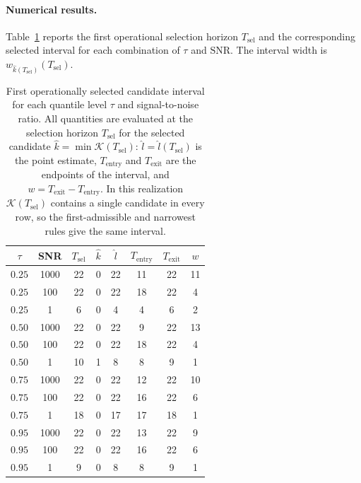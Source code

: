 \documentclass[12pt,a4paper]{article}
\begin{document}
\paragraph{Numerical results.}
Table~\ref{tab:simulation_est_interval} reports the first operational
selection horizon $T_{\mathrm{sel}}$ and the corresponding selected
interval for each combination of $\tau$ and $\mathrm{SNR}$. The
interval width is
$w_{\widehat k(T_{\mathrm{sel}})}(T_{\mathrm{sel}})$.

\begin{table}[htbp]
	\centering
	\caption{First operationally selected candidate interval for each quantile level
		$\tau$ and signal-to-noise ratio. All quantities are evaluated at the selection
		horizon $T_{\mathrm{sel}}$ for the selected candidate
		$\widehat k=\min\mathcal K(T_{\mathrm{sel}})$: $\widehat l=\widehat l(T_{\mathrm{sel}})$
		is the point estimate, $T_{\mathrm{entry}}$ and $T_{\mathrm{exit}}$ are the
		endpoints of the interval, and $w=T_{\mathrm{exit}}-T_{\mathrm{entry}}$. In
		this realization $\mathcal K(T_{\mathrm{sel}})$ contains a single candidate in
		every row, so the first-admissible and narrowest rules give the same interval.}
	\label{tab:simulation_est_interval}
	\begin{tabular}{cccccccc}
		\toprule
		$\tau$ & SNR & $T_{\mathrm{sel}}$ & $\widehat k$ & $\widehat l$ & $T_{\mathrm{entry}}$ & $T_{\mathrm{exit}}$ & $w$ \\
		\midrule
		$0.25$ & 1000 & 22 & 0 & 22 & 11 & 22 & 11 \\
		$0.25$ & 100  & 22 & 0 & 22 & 18 & 22 &  4 \\
		$0.25$ & 1    &  6 & 0 &  4 &  4 &  6 &  2 \\
		\midrule
		$0.50$ & 1000 & 22 & 0 & 22 &  9 & 22 & 13 \\
		$0.50$ & 100  & 22 & 0 & 22 & 18 & 22 &  4 \\
		$0.50$ & 1    & 10 & 1 &  8 &  8 &  9 &  1 \\
		\midrule
		$0.75$ & 1000 & 22 & 0 & 22 & 12 & 22 & 10 \\
		$0.75$ & 100  & 22 & 0 & 22 & 16 & 22 &  6 \\
		$0.75$ & 1    & 18 & 0 & 17 & 17 & 18 &  1 \\
		\midrule
		$0.95$ & 1000 & 22 & 0 & 22 & 13 & 22 &  9 \\
		$0.95$ & 100  & 22 & 0 & 22 & 16 & 22 &  6 \\
		$0.95$ & 1    &  9 & 0 &  8 &  8 &  9 &  1 \\
		\bottomrule
	\end{tabular}
\end{table}
\end{document}
